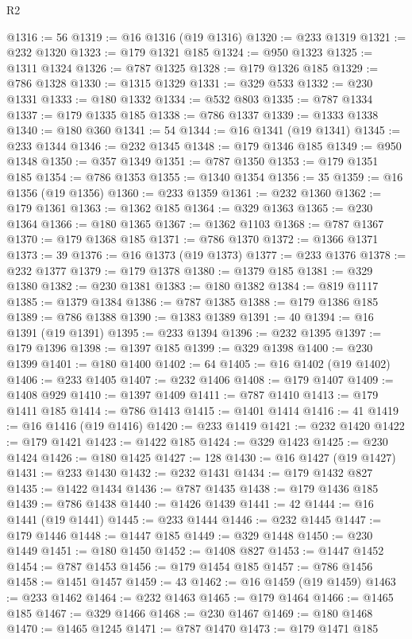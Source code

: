 \begin{lexlean}{R2}
\begin{coremodule}
@1316 := 56
@1319 := @16 @1316 (@19 @1316)
@1320 := @233 @1319
@1321 := @232 @1320
@1323 := @179 @1321 @185
@1324 := @950 @1323
@1325 := @1311 @1324
@1326 := @787 @1325
@1328 := @179 @1326 @185
@1329 := @786 @1328
@1330 := @1315 @1329
@1331 := @329 @533
@1332 := @230 @1331
@1333 := @180 @1332
@1334 := @532 @803
@1335 := @787 @1334
@1337 := @179 @1335 @185
@1338 := @786 @1337
@1339 := @1333 @1338
@1340 := @180 @360
@1341 := 54
@1344 := @16 @1341 (@19 @1341)
@1345 := @233 @1344
@1346 := @232 @1345
@1348 := @179 @1346 @185
@1349 := @950 @1348
@1350 := @357 @1349
@1351 := @787 @1350
@1353 := @179 @1351 @185
@1354 := @786 @1353
@1355 := @1340 @1354
@1356 := 35
@1359 := @16 @1356 (@19 @1356)
@1360 := @233 @1359
@1361 := @232 @1360
@1362 := @179 @1361
@1363 := @1362 @185
@1364 := @329 @1363
@1365 := @230 @1364
@1366 := @180 @1365
@1367 := @1362 @1103
@1368 := @787 @1367
@1370 := @179 @1368 @185
@1371 := @786 @1370
@1372 := @1366 @1371
@1373 := 39
@1376 := @16 @1373 (@19 @1373)
@1377 := @233 @1376
@1378 := @232 @1377
@1379 := @179 @1378
@1380 := @1379 @185
@1381 := @329 @1380
@1382 := @230 @1381
@1383 := @180 @1382
@1384 := @819 @1117
@1385 := @1379 @1384
@1386 := @787 @1385
@1388 := @179 @1386 @185
@1389 := @786 @1388
@1390 := @1383 @1389
@1391 := 40
@1394 := @16 @1391 (@19 @1391)
@1395 := @233 @1394
@1396 := @232 @1395
@1397 := @179 @1396
@1398 := @1397 @185
@1399 := @329 @1398
@1400 := @230 @1399
@1401 := @180 @1400
@1402 := 64
@1405 := @16 @1402 (@19 @1402)
@1406 := @233 @1405
@1407 := @232 @1406
@1408 := @179 @1407
@1409 := @1408 @929
@1410 := @1397 @1409
@1411 := @787 @1410
@1413 := @179 @1411 @185
@1414 := @786 @1413
@1415 := @1401 @1414
@1416 := 41
@1419 := @16 @1416 (@19 @1416)
@1420 := @233 @1419
@1421 := @232 @1420
@1422 := @179 @1421
@1423 := @1422 @185
@1424 := @329 @1423
@1425 := @230 @1424
@1426 := @180 @1425
@1427 := 128
@1430 := @16 @1427 (@19 @1427)
@1431 := @233 @1430
@1432 := @232 @1431
@1434 := @179 @1432 @827
@1435 := @1422 @1434
@1436 := @787 @1435
@1438 := @179 @1436 @185
@1439 := @786 @1438
@1440 := @1426 @1439
@1441 := 42
@1444 := @16 @1441 (@19 @1441)
@1445 := @233 @1444
@1446 := @232 @1445
@1447 := @179 @1446
@1448 := @1447 @185
@1449 := @329 @1448
@1450 := @230 @1449
@1451 := @180 @1450
@1452 := @1408 @827
@1453 := @1447 @1452
@1454 := @787 @1453
@1456 := @179 @1454 @185
@1457 := @786 @1456
@1458 := @1451 @1457
@1459 := 43
@1462 := @16 @1459 (@19 @1459)
@1463 := @233 @1462
@1464 := @232 @1463
@1465 := @179 @1464
@1466 := @1465 @185
@1467 := @329 @1466
@1468 := @230 @1467
@1469 := @180 @1468
@1470 := @1465 @1245
@1471 := @787 @1470
@1473 := @179 @1471 @185

\end{coremodule}
\end{lexlean}
